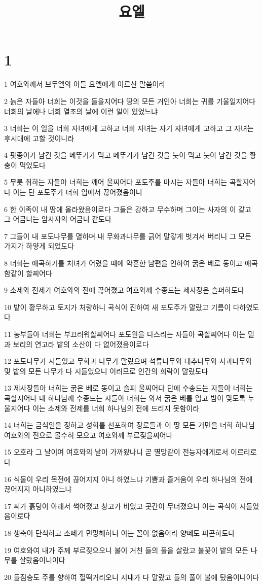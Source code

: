 

\title{요엘}


\chapter{1}

\par 1 여호와께서 브두엘의 아들 요엘에게 이르신 말씀이라
\par 2 늙은 자들아 너희는 이것을 들을지어다 땅의 모든 거인아 너희는 귀를 기울일지어다 너희의 날에나 너희 열조의 날에 이런 일이 있었느냐
\par 3 너희는 이 일을 너희 자녀에게 고하고 너희 자녀는 자기 자녀에게 고하고 그 자녀는 후시대에 고할 것이니라
\par 4 팟종이가 남긴 것을 메뚜기가 먹고 메뚜기가 남긴 것을 늣이 먹고 늣이 남긴 것을 황충이 먹었도다
\par 5 무릇 취하는 자들아 너희는 깨어 울찌어다 포도주를 마시는 자들아 너희는 곡할지어다 이는 단 포도주가 너희 입에서 끊어졌음이니
\par 6 한 이족이 내 땅에 올라왔음이로다 그들은 강하고 무수하며 그이는 사자의 이 같고 그 어금니는 암사자의 어금니 같도다
\par 7 그들이 내 포도나무를 멸하며 내 무화과나무를 긁어 말갛게 벗겨서 버리니 그 모든 가지가 하얗게 되었도다
\par 8 너희는 애곡하기를 처녀가 어렸을 때에 약혼한 남편을 인하여 굵은 베로 동이고 애곡함같이 할찌어다
\par 9 소제와 전제가 여호와의 전에 끊어졌고 여호와께 수종드는 제사장은 슬퍼하도다
\par 10 밭이 황무하고 토지가 처량하니 곡식이 진하여 새 포도주가 말랐고 기름이 다하였도다
\par 11 농부들아 너희는 부끄러워할찌어다 포도원을 다스리는 자들아 곡할찌어다 이는 밀과 보리의 연고라 밭의 소산이 다 없어졌음이로다
\par 12 포도나무가 시들었고 무화과 나무가 말랐으며 석류나무와 대추나무와 사과나무와 및 밭의 모든 나무가 다 시들었으니 이러므로 인간의 희락이 말랐도다
\par 13 제사장들아 너희는 굵은 베로 동이고 슬피 울찌어다 단에 수송드는 자들아 너희는 곡할지어다 내 하나님께 수종드는 자들아 너희는 와서 굵은 베를 입고 밤이 맞도록 누울지어다 이는 소제와 전제를 너희 하나님의 전에 드리지 못함이라
\par 14 너희는 금식일을 정하고 성회를 선포하여 장로들과 이 땅 모든 거민을 너희 하나님 여호와의 전으로 몰수히 모으고 여호와께 부르짖을찌어다
\par 15 오호라 그 날이여 여호와의 날이 가까왔나니 곧 멸망같이 전능자에게로서 이르리로다
\par 16 식물이 우리 목전에 끊어지지 아니 하였느냐 기쁨과 즐거움이 우리 하나님의 전에 끊어지지 아니하였느냐
\par 17 씨가 흙덩이 아래서 썩어졌고 창고가 비었고 곳간이 무너졌으니 이는 곡식이 시들었음이로다
\par 18 생축이 탄식하고 소떼가 민망해하니 이는 꼴이 없음이라 양떼도 피곤하도다
\par 19 여호와여 내가 주께 부르짖으오니 불이 거친 들의 풀을 살랐고 불꽃이 밭의 모든 나무를 살랐음이니이다
\par 20 들짐승도 주를 향하여 헐떡거리오니 시내가 다 말랐고 들의 풀이 불에 탔음이니이다

